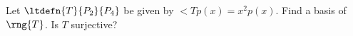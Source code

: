 Let $\ltdefn{T}{P_2}{P_4}$ be given by 
$\lt{T}{p(x)} = x^2 p(x)$.  
Find a basis of $\rng{T}$.  
Is $T$ surjective?  
%